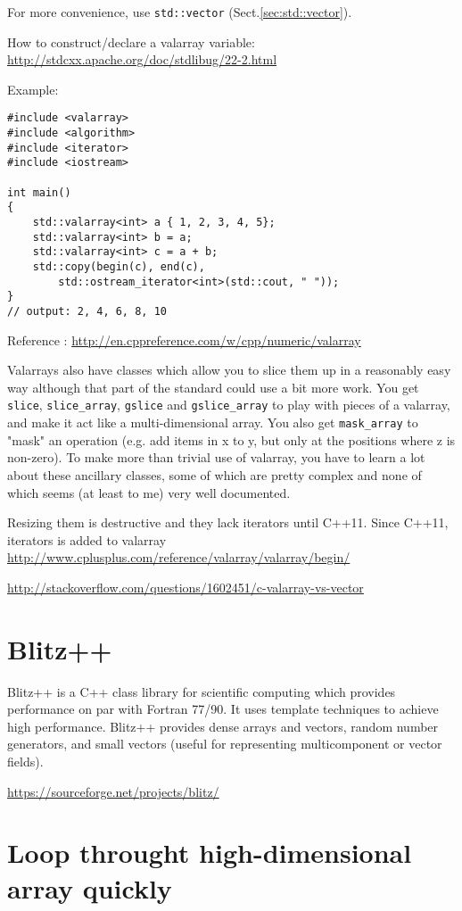 For more convenience, use \verb!std::vector! (Sect.\ref{sec:std::vector}).

How to construct/declare a
valarray variable: \url{http://stdcxx.apache.org/doc/stdlibug/22-2.html}

Example:
\begin{lstlisting}
#include <valarray>
#include <algorithm>
#include <iterator>
#include <iostream>

int main()
{
    std::valarray<int> a { 1, 2, 3, 4, 5};
    std::valarray<int> b = a;
    std::valarray<int> c = a + b;
    std::copy(begin(c), end(c),
        std::ostream_iterator<int>(std::cout, " "));
}
// output: 2, 4, 6, 8, 10
\end{lstlisting}

Reference : \url{http://en.cppreference.com/w/cpp/numeric/valarray}

Valarrays also have classes which allow you to slice them up in a reasonably
easy way although that part of the standard could use a bit more work. You get
\verb!slice!, \verb!slice_array!, \verb!gslice! and \verb!gslice_array! to play
with pieces of a valarray, and make it act like a multi-dimensional array. You
also get \verb!mask_array! to "mask" an operation (e.g. add items in x to y, but
only at the positions where z is non-zero). To make more than trivial use of
valarray, you have to learn a lot about these ancillary classes, some of which
are pretty complex and none of which seems (at least to me) very well
documented.

Resizing them is destructive and they lack iterators until C++11.
Since C++11, iterators is added to valarray
\url{http://www.cplusplus.com/reference/valarray/valarray/begin/}

\url{http://stackoverflow.com/questions/1602451/c-valarray-vs-vector}

\section{Blitz++}
\label{sec:Blitz++}

Blitz++ is a C++ class library for scientific computing which provides
performance on par with Fortran 77/90. It uses template techniques to achieve
high performance. Blitz++ provides dense arrays and vectors, random number
generators, and small vectors (useful for representing multicomponent or vector
fields).

\url{https://sourceforge.net/projects/blitz/}


\section{Loop throught high-dimensional array quickly}
\label{sec:loop-through-array}

